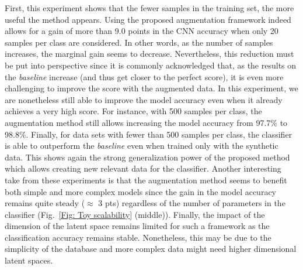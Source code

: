 \documentclass[10pt,journal,compsoc]{IEEEtran}
\begin{document}
First, this experiment shows that the fewer samples in the training set, the more useful the method appears. Using the proposed augmentation framework indeed allows for a gain of more than 9.0 points in the CNN accuracy when only 20 samples per class are considered. In other words, as the number of samples increases, the marginal gain seems to decrease. Nevertheless, this reduction must be put into perspective since it is commonly acknowledged that, as the results on the \emph{baseline} increase (and thus get closer to the perfect score), it is even more challenging to improve the score with the augmented data. In this experiment, we are nonetheless still able to improve the model accuracy even when it already achieves a very high score. For instance, with 500 samples per class, the augmentation method still allows increasing the model accuracy from 97.7\% to 98.8\%. Finally, for data sets with fewer than 500 samples per class, the classifier is able to outperform the \emph{baseline} even when trained only with the synthetic data. This shows again the strong generalization power of the proposed method which allows creating new relevant data for the classifier. Another interesting take from these experiments is that the augmentation method seems to benefit both simple and more complex models since the gain in the model accuracy remains quite steady ($\approx$ 3 pts) regardless of the number of parameters in the classifier (Fig.~\ref{Fig: Toy scalability} (middle)). Finally, the impact of the dimension of the latent space remains limited for such a framework as the classification accuracy remains stable. Nonetheless, this may be due to the simplicity of the database and more complex data might need higher dimensional latent spaces.

\begin{figure*}[!ht]
    \centering
\hfil 
 \centering
\hfil
 \centering
    
    \caption{Evolution of the accuracy of a benchmark DenseNet classifier according to the number of samples in the train set (\emph{i.e.} the \emph{baseline}) (\emph{left}), the number of parameters of the Densenet (\emph{middle}) and the latent space dimension of the VAE (\emph{right}) on MNIST. Curves show the mean accuracy and standard deviation across 5 runs on the original test set for the \emph{baseline} (blue), the augmented data (orange) and the synthetic ones (green).}
    \label{Fig: Toy scalability}
\end{figure*}
\end{document}
